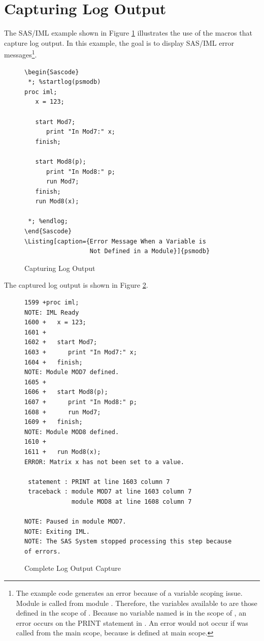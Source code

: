 \documentclass[article,oneside]{memoir}
\begin{document}
\section{Capturing Log Output}

  The SAS/IML example shown in Figure \ref{logout} illustrates
  the use of the macros that capture log output. In this example, the goal is to
  display SAS/IML error messages\footnote{The example code generates an error because
  of a variable scoping issue.
  Module  is called from module . Therefore, the variables
  available to  are those defined in the scope of .
  Because no variable named  is in the  scope of ,
  an error occurs on the PRINT statement in .
  An error would not occur if  was called from the main scope,
  because  is defined at main scope.}.

\begin{figure}[H]
\begin{snugshade}
\begin{verbatim}
\begin{Sascode}
 *; %startlog(psmodb)
proc iml;
   x = 123;

   start Mod7;
      print "In Mod7:" x;
   finish;

   start Mod8(p);
      print "In Mod8:" p;
      run Mod7;
   finish;
   run Mod8(x);

 *; %endlog;
\end{Sascode}
\Listing[caption={Error Message When a Variable is
                  Not Defined in a Module}]{psmodb}
\end{verbatim}
\end{snugshade}
\caption{Capturing Log Output}\label{logout}
\end{figure}

  The captured log output is shown in Figure \ref{logcomplete}.


\begin{figure}[H]
\begin{snugshade}
\begin{verbatim}
1599 +proc iml;
NOTE: IML Ready
1600 +   x = 123;
1601 +
1602 +   start Mod7;
1603 +      print "In Mod7:" x;
1604 +   finish;
NOTE: Module MOD7 defined.
1605 +
1606 +   start Mod8(p);
1607 +      print "In Mod8:" p;
1608 +      run Mod7;
1609 +   finish;
NOTE: Module MOD8 defined.
1610 +
1611 +   run Mod8(x);
ERROR: Matrix x has not been set to a value.

 statement : PRINT at line 1603 column 7
 traceback : module MOD7 at line 1603 column 7
             module MOD8 at line 1608 column 7

NOTE: Paused in module MOD7.
NOTE: Exiting IML.
NOTE: The SAS System stopped processing this step because of errors.
\end{verbatim}
\end{snugshade}
\caption{Complete Log Output Capture}\label{logcomplete}
\end{figure}
\end{document}
